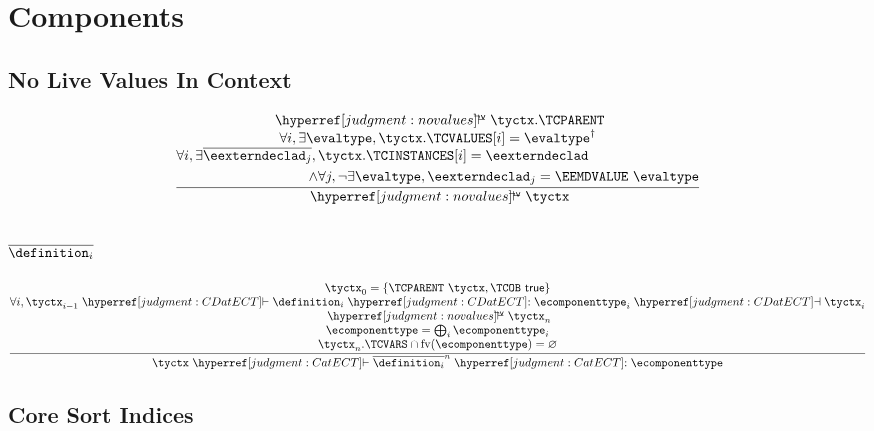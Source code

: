 \section{Components}

\subsection{No Live Values In Context}
\label{judgment:novalues}
\fbox{$\novalues{\tyctx}$}
\[
  \frac{
    \begin{array}{@{}c@{}}
    \novalues\tyctx.\TCPARENT\\
    \forall i, \exists \evaltype, \tyctx.\TCVALUES[i] = \evaltype^\dagger\\
    \begin{aligned}\forall i, \exists \overline{\eexterndeclad_j},{}&\tyctx.\TCINSTANCES[i] = \eexterndeclad\\\land{}&{}\forall j, \neg \exists \evaltype, \eexterndeclad_j = \EEMDVALUE~\evaltype\\\end{aligned}\\
    \end{array}
  }{
    \novalues \tyctx
  }
\]

\subsection{$\overline{\definition_i}$}
\label{judgment:CatECT}
\[
  \frac{
    \begin{array}{@{}c@{}}
    \tyctx_0 = \{ \TCPARENT~\tyctx, \TCOB~\true \}\\
    \forall i, \tyctx_{i-1} \vdashh!CDatECT! \definition_i \trelh!CDatECT! {\ecomponenttype}_i \dashvh!CDatECT! \tyctx_i\\
    \novalues\tyctx_n\\
    \ecomponenttype = \bigoplus_i \ecomponenttype_i\\
    \tyctx_n.\TCVARS \cap \freeVars{\ecomponenttype} = \varnothing\\
    \end{array}
  }{
    \tyctx \vdashh!CatECT! \overline{\definition_i}^n
    \trelh!CatECT! \ecomponenttype
  }
\]

\subsection{Core Sort Indices}
\label{judgment:CSIatCID}

